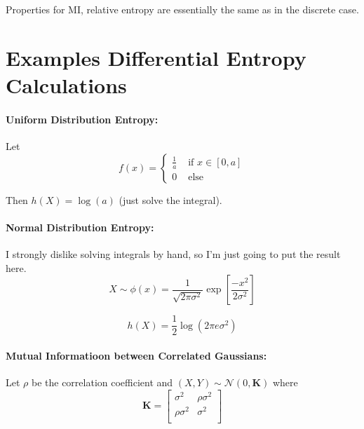 \documentclass[a4paper,12pt]{report}
\begin{document}
Properties for MI, relative entropy are essentially the same as in the discrete
case. 








\section{Examples Differential Entropy Calculations}

\paragraph{Uniform Distribution Entropy: } Let 
\begin{equation}
	f(x) = \begin{cases} 
		\frac{1}{a} & \text{ if } x \in [0,a] \\
		0 			& \text{ else}
	\end{cases}
\end{equation}

Then $h(X) = \log(a)$ (just solve the integral). 


\paragraph{Normal Distribution Entropy: } I strongly dislike solving integrals by hand,
so I'm just going to put the result here.
\begin{equation}
	X \sim \phi(x) = \frac{1}{\sqrt{2\pi\sigma^2}} \exp[\frac{-x^2}{2\sigma^2}]
\end{equation}

\begin{equation}
	h(X) = \frac{1}{2} \log (2\pi e \sigma^2)
\end{equation}


\paragraph{Mutual Informatioon between Correlated Gaussians: } Let $\rho$ be the
correlation coefficient and $(X, Y)\sim \mathcal N (0, \mathbf K)$ where 
\begin{equation}
	\mathbf K = \begin{bmatrix}
		\sigma^2      &  \rho \sigma^2 \\
		\rho \sigma^2 &  \sigma^2      \\
	\end{bmatrix}
\end{equation}
\end{document}
